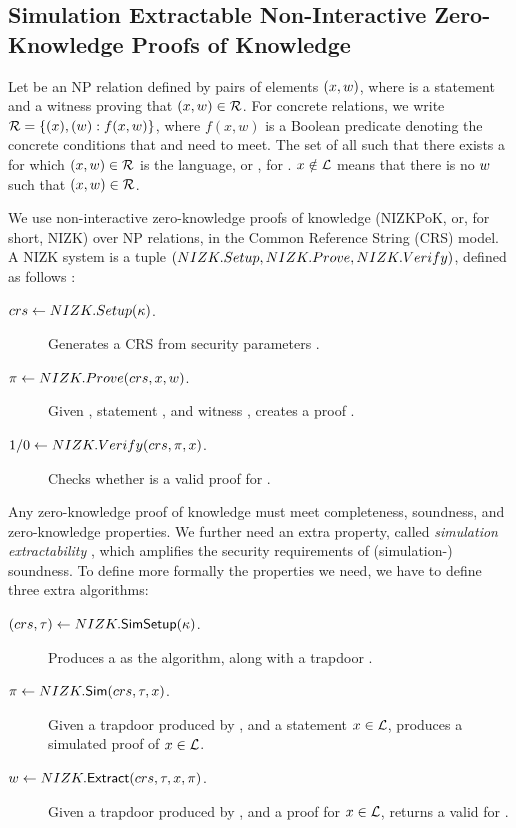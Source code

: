\subsection{Simulation Extractable Non-Interactive Zero-Knowledge
  Proofs of Knowledge}
\label{sapp:nizk}

Let \NIZKRel be an NP relation defined by pairs of elements $(x,w)$,
where \NIZKx is a statement and \NIZKw a witness proving that $(x,w)
\in \mathcal{R}$. For concrete relations, we write $\mathcal{R} = \lbrace (x),
(w): f(x,w) \rbrace$, where $f(x,w)$ is a Boolean predicate denoting the
concrete conditions that \NIZKx and \NIZKw need to meet. The set of all \NIZKx
such that there exists a \NIZKw for which $(x,w) \in \mathcal{R}$ is the
language, or \NIZKLang, for \NIZKRel. $x \notin \mathcal{L}$ means that
there is no $w$ such that $(x,w) \in \mathcal{R}$.

We use non-interactive zero-knowledge proofs of knowledge (NIZKPoK, or, for
short, NIZK) over NP relations, in the Common Reference String (CRS) model. A
NIZK system is a tuple $(NIZK.Setup,NIZK.Prove,NIZK.Verify)$, defined as follows
\cite{gos06}:

\begin{description}
\item[$crs \gets NIZK.Setup(\kappa)$.] Generates a CRS \NIZKcrs from
  security parameters \secpar.
\item[$\pi \gets NIZK.Prove(crs,x,w)$.] Given \NIZKcrs,
  statement \NIZKx, and witness \NIZKw, creates a proof \NIZKproof.
\item[$1/0 \gets NIZK.Verify(crs,\pi,x)$.] Checks whether
  \NIZKproof is a valid proof for \NIZKx.
\end{description}

Any zero-knowledge proof of knowledge must meet completeness, soundness, and
zero-knowledge properties. We further need an extra property, called
\emph{simulation extractability} \cite{cl06}, which amplifies the security
requirements of (simulation-) soundness.
%
To define more formally the properties we need, we have to define three extra
algorithms:

\begin{description}
\item[$(crs,\tau) \gets NIZK.\mathsf{SimSetup}(\kappa)$.] Produces a
  \NIZKcrs as the \NIZKSetup algorithm, along with a trapdoor \NIZKtrap.
\item[$\pi \gets NIZK.\mathsf{Sim}(crs,\tau,x)$.] Given a trapdoor
  \NIZKtrap produced by \NIZKSimSetup, and a statement $x \in \mathcal{L}$,
  produces a simulated proof \NIZKproof of $x \in \mathcal{L}$.
\item[$w \gets NIZK.\mathsf{Extract}(crs,\tau,x,\pi)$.] Given
  a trapdoor \NIZKtrap produced by \NIZKSimSetup, and a proof \NIZKproof for
  $x \in \mathcal{L}$, returns a valid \NIZKw for \NIZKx.
\end{description}

